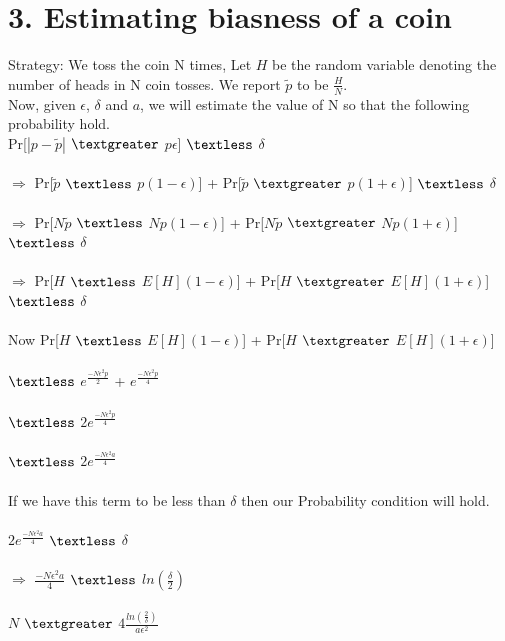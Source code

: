 \documentclass{article}
\begin{document}
\section*{3. Estimating biasness of a coin }
Strategy:
We toss the coin N times, Let $H$ be the random variable denoting the number of heads in N coin tosses. We report $\widetilde{p}$ to be $\frac{H}{N}$. \\
Now, given $\epsilon$, $\delta$ and $a$, we will estimate the value of N so that the following probability hold. \\
Pr[$|p - \widetilde{p}|$ $\textgreater$ $p\epsilon$] $\textless$ $\delta$ \\\\
$\Longrightarrow$ Pr[$\widetilde{p}$ $\textless$ $p(1 - \epsilon)$]
+ Pr[$\widetilde{p}$ $\textgreater$ $p(1 + \epsilon)$] $\textless$ $\delta$ \\\\
$\Longrightarrow$ Pr[$N\widetilde{p}$ $\textless$ $Np(1 - \epsilon)$]
+ Pr[$N\widetilde{p}$ $\textgreater$ $Np(1 + \epsilon)$] $\textless$ $\delta$ \\\\
$\Longrightarrow$ Pr[$H$ $\textless$ $E[H](1-\epsilon)$] + Pr[$H$ $\textgreater$ $E[H](1+\epsilon)$] $\textless$ $\delta$ \\\\
Now Pr[$H$ $\textless$ $E[H](1-\epsilon)$] + Pr[$H$ $\textgreater$ $E[H](1+\epsilon)$] \\\\ $\textless$ $e^{\frac{-N\epsilon^{2}p}{2}}$ + $e^{\frac{-N\epsilon^{2}p}{4}}$ \\\\ $\textless$ $2e^{\frac{-N\epsilon^{2}p}{4}}$ \\\\ $\textless$ $2e^{\frac{-N\epsilon^{2}a}{4}}$ \\\\
If we have this term to be less than $\delta$ then our Probability condition will hold.\\\\ 
$2e^{\frac{-N\epsilon^{2}a}{4}}$ $\textless$ $\delta$ \\\\
$\Longrightarrow$
$\frac{-N\epsilon^{2}a}{4}$ $\textless$ $ln(\frac{\delta}{2})$
\\\\
$N$ $\textgreater$ $4\frac{ln(\frac{2}{\delta})}{a\epsilon^{2}}$
\end{document}
